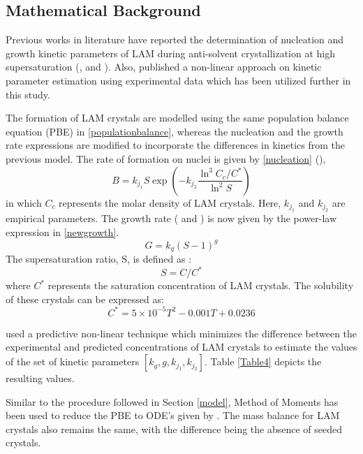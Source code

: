 \documentclass[3p,times,authoryear]{elsarticle}
\begin{document}
\subsection{Mathematical Background}


Previous works in literature have reported the determination of nucleation and growth kinetic parameters of LAM during anti-solvent crystallization at high supersaturation (\cite{lindenberg}, \cite{mahajan1994nucleation} and \cite{zarkadas2006antisolvent}). Also, \cite{bhoi} published a non-linear approach on kinetic parameter estimation using experimental data which has been utilized further in this study.
\par
The formation of LAM crystals are modelled using the same population balance equation (PBE) in \ref{populationbalance}, whereas the nucleation and the growth rate expressions are modified to incorporate the differences in kinetics from the previous model. The rate of formation on nuclei is given by \ref{nucleation} (\cite{lindenberg}), 
\begin{equation}
B = k_{j_{1}}S\exp\left( -k_{j_{2}}\frac{\ln^{3}{C_{c}/C^{*}}}{\ln^{2}S}\right) \label{nucleation}
\end{equation}
in which $C_{c}$ represents the  molar density of LAM crystals. Here, $k_{j_{1}}$ and $k_{j_{2}}$ are empirical parameters. The growth rate (\cite{nagy} and \cite{nagy2}) is now given by the power-law expression in \ref{newgrowth}. 
\begin{equation}
G = k_{g}(S-1)^{g} \label{newgrowth}
\end{equation}
The supersaturation ratio, S, is defined as :
\begin{equation}
S = C/C^{*}
\end{equation}
where $C^{*}$ represents the saturation concentration of LAM crystals. The solubility of these crystals can be expressed as:
\begin{equation}
C^{*} = 5 \times 10^{-5}T^{2} - 0.001T + 0.0236
\end{equation}

\cite{bhoi} used a predictive non-linear technique which minimizes the difference between the experimental and predicted concentrations of LAM crystals to estimate the values of the set of kinetic parameters $[k_{g}, g, k_{j_{1}}, k_{j_{2}}]$. Table \ref{Table4} depicts the resulting values. 
\par
Similar to the procedure followed in Section \ref{model}, Method of Moments has been used to reduce the PBE to ODE's given by . The mass balance for LAM crystals also remains the same, with the difference being the absence of seeded crystals.\\
\end{document}

